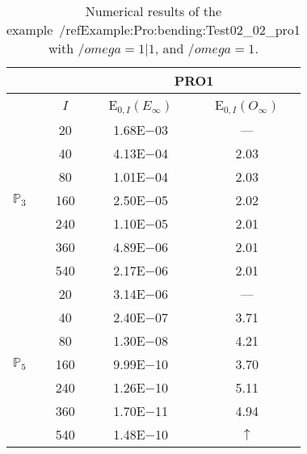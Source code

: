 \begin{table}[H]
\caption{Numerical results of the example~/ref{Example:Pro:bending:Test02_02_pro1} with $/omega=1|1$, and $/omega=1$.}
\setlength{\tabcolsep}{5pt}
\centering
\begin{tabular}{@{}l c c c@{}}
\toprule
 &  & \multicolumn{2}{c}{PRO1}\\
\midrule
 & $I$ & E$_{0,I}(E_{\infty})$ & E$_{0,I}(O_{\infty})$\\
\midrule
\multirow{7}{*}{$\mathbb{P}_{3}$}
 & 20 & 1.68E$-$03 & ---\\
 & 40 & 4.13E$-$04 & 2.03\\
 & 80 & 1.01E$-$04 & 2.03\\
 & 160 & 2.50E$-$05 & 2.02\\
 & 240 & 1.10E$-$05 & 2.01\\
 & 360 & 4.89E$-$06 & 2.01\\
 & 540 & 2.17E$-$06 & 2.01\\
\midrule
\multirow{7}{*}{$\mathbb{P}_{5}$}
 & 20 & 3.14E$-$06 & ---\\
 & 40 & 2.40E$-$07 & 3.71\\
 & 80 & 1.30E$-$08 & 4.21\\
 & 160 & 9.99E$-$10 & 3.70\\
 & 240 & 1.26E$-$10 & 5.11\\
 & 360 & 1.70E$-$11 & 4.94\\
 & 540 & 1.48E$-$10 & $\uparrow$\\
\bottomrule
\end{tabular}
\label{Table:PRO:test_02_02_test5_pro1}
\end{table}
